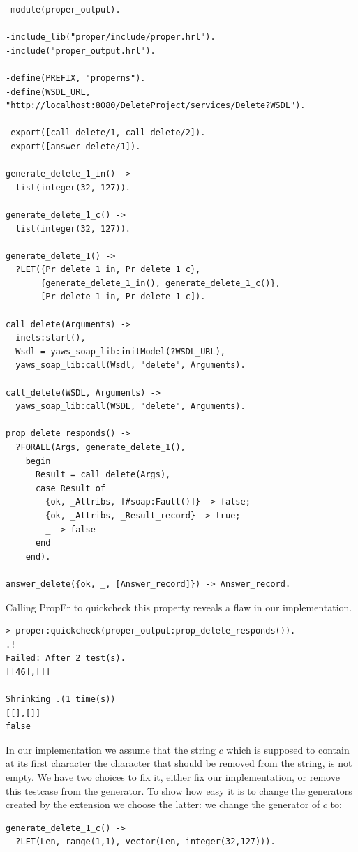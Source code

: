 \documentclass[submission,copyright,a4]{eptcs}
\begin{document}
\begin{lstlisting}
-module(proper_output).

-include_lib("proper/include/proper.hrl").
-include("proper_output.hrl").

-define(PREFIX, "properns").
-define(WSDL_URL, "http://localhost:8080/DeleteProject/services/Delete?WSDL").

-export([call_delete/1, call_delete/2]).
-export([answer_delete/1]).

generate_delete_1_in() -> 
  list(integer(32, 127)).

generate_delete_1_c() -> 
  list(integer(32, 127)).

generate_delete_1() -> 
  ?LET({Pr_delete_1_in, Pr_delete_1_c},
       {generate_delete_1_in(), generate_delete_1_c()},
       [Pr_delete_1_in, Pr_delete_1_c]).

call_delete(Arguments) ->
  inets:start(),
  Wsdl = yaws_soap_lib:initModel(?WSDL_URL),
  yaws_soap_lib:call(Wsdl, "delete", Arguments).
    
call_delete(WSDL, Arguments) ->
  yaws_soap_lib:call(WSDL, "delete", Arguments).

prop_delete_responds() ->
  ?FORALL(Args, generate_delete_1(),
    begin
      Result = call_delete(Args),
      case Result of 
        {ok, _Attribs, [#soap:Fault()]} -> false; 
        {ok, _Attribs, _Result_record} -> true;
        _ -> false
      end
    end).

answer_delete({ok, _, [Answer_record]}) -> Answer_record.
\end{lstlisting}

Calling PropEr to quickcheck this property reveals a flaw in our implementation.
\begin{lstlisting}
> proper:quickcheck(proper_output:prop_delete_responds()). 
.!
Failed: After 2 test(s).
[[46],[]]

Shrinking .(1 time(s))
[[],[]]
false
\end{lstlisting}

In our implementation we assume that the string $c$ which is supposed
to contain at its first character the character that should be removed
from the string, is not empty. We have two choices to fix it, either
fix our implementation, or remove this testcase from the generator. To
show how easy it is to change the generators created by the extension
we choose the latter: we change the generator of $c$ to:
\begin{lstlisting}
generate_delete_1_c() ->
  ?LET(Len, range(1,1), vector(Len, integer(32,127))).
\end{lstlisting}
\end{document}
